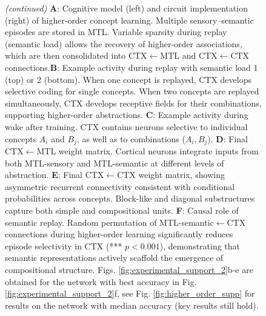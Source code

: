 \documentclass{article}
\begin{document}
\begin{figure}[h!]
  \ContinuedFloat
  \captionsetup{list=off} %
  \caption{\textit{(continued)} \textbf{A}: Cognitive model (left) and circuit implementation (right) of higher-order concept learning. Multiple sensory–semantic episodes are stored in MTL. Variable sparsity during replay (semantic load) allows the recovery of higher-order associations, which are then consolidated into CTX$\leftarrow$MTL and  CTX$\leftarrow$CTX connections.\textbf{B}: Example activity during replay with semantic load 1 (top) or 2 (bottom). When one concept is replayed, CTX develops selective coding for single concepts. When two concepts are replayed simultaneously, CTX develops receptive fields for their combinations, supporting higher-order abstractions.  
\textbf{C}: Example activity during wake after training. CTX contains neurons selective to individual concepts $A_i$ and $B_j$, as well as to combinations ($A_i, B_j$).  
\textbf{D}: Final CTX$\leftarrow$MTL weight matrix. Cortical neurons integrate inputs from both MTL-sensory and MTL-semantic at different levels of abstraction.
\textbf{E}: Final CTX$\leftarrow$CTX weight matrix, showing asymmetric recurrent connectivity consistent with conditional probabilities across concepts. Block-like and diagonal substructures capture both simple and compositional units.  
\textbf{F}: Causal role of semantic replay. Random permutation of MTL-semantic$\leftarrow$CTX connections during higher-order learning significantly reduces episode selectivity in CTX (*** $p<0.001$), demonstrating that semantic representations actively scaffold the emergence of compositional structure. Figs. \ref{fig:experimental_support_2}b-e are obtained for the network with best accuracy in Fig. \ref{fig:experimental_support_2}f, see Fig. \ref{fig:higher_order_supp} for results on the network with median accuracy (key results still hold).}
\end{figure}
\newpage
\end{document}
